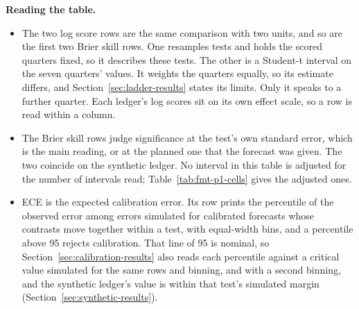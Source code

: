\documentclass[sigconf,nonacm]{acmart}
\begin{document}
\begin{table}[t]\centering\footnotesize
\caption{Results at a glance: the main numbers of the headline archive, with the synthetic ledger beside them, for the prior (P1) unless a row names another model. Intervals are bootstrap by test, at 90 percent, unless the row says otherwise. Each measure is defined in Section~\ref{sec:protocol}. Sources: Tables~\ref{tab:main-upworthy}, \ref{tab:main-synthetic}, \ref{tab:fmt-p1-cells}, \ref{tab:fmt-by-origin}, \ref{tab:fmt-skill-by-origin} and~\ref{tab:fmt-ranking-paired}. The confirmatory split's numbers are in Table~\ref{tab:fmt-confirmatory}.}
\label{tab:glance}

\par\smallskip\parbox{0.92\textwidth}{\scriptsize\raggedright
\textbf{Reading the table.}
\begin{itemize}\setlength{\itemsep}{0pt}
\item The two log score rows are the same comparison with two units, and so are the first two Brier skill rows. One resamples tests and holds the scored quarters fixed, so it describes these tests. The other is a Student-t interval on the seven quarters' values. It weights the quarters equally, so its estimate differs, and Section~\ref{sec:ladder-results} states its limits. Only it speaks to a further quarter. Each ledger's log scores sit on its own effect scale, so a row is read within a column.
\item The Brier skill rows judge significance at the test's own standard error, which is the main reading, or at the planned one that the forecast was given. The two coincide on the synthetic ledger. No interval in this table is adjusted for the number of intervals read; Table~\ref{tab:fmt-p1-cells} gives the adjusted ones.
\item ECE is the expected calibration error. Its row prints the percentile of the observed error among errors simulated for calibrated forecasts whose contrasts move together within a test, with equal-width bins, and a percentile above 95 rejects calibration. That line of 95 is nominal, so Section~\ref{sec:calibration-results} also reads each percentile against a critical value simulated for the same rows and binning, and with a second binning, and the synthetic ledger's value is within that test's simulated margin (Section~\ref{sec:synthetic-results}).
\end{itemize}}
\end{table}
\end{document}
